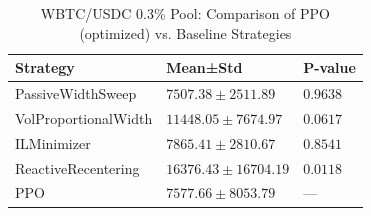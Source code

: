 \begin{table}
\caption{WBTC/USDC 0.3\% Pool: Comparison of PPO (optimized) vs. Baseline Strategies}
\label{tab:baseline_comparison_wbtc}
\begin{tabular}{lll}
\toprule
Strategy & Mean±Std & P-value \\
\midrule
PassiveWidthSweep & $7507.38 \pm 2511.89$ & $0.9638$ \\
VolProportionalWidth & $11448.05 \pm 7674.97$ & $0.0617$ \\
ILMinimizer & $7865.41 \pm 2810.67$ & $0.8541$ \\
ReactiveRecentering & $16376.43 \pm 16704.19$ & $0.0118$ \\
PPO & $7577.66 \pm 8053.79$ & — \\
\bottomrule
\end{tabular}
\end{table}
